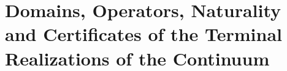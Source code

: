 \HMTFlushCurrentChapter
\chapter{Domains, Operators, Naturality and Certificates of the Terminal Realizations of the Continuum}
\begingroup
\renewcommand{\chapter}[2][]{}%

\endgroup











\HMTFlushCurrentChapter
